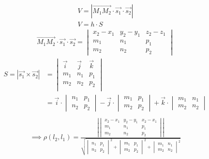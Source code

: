 \begin{gather*}
  V = |\overrightarrow{M_1M_2} \cdot \vec{s_1} \cdot \vec{s_2}| \\
  V= h \cdot S
\end{gather*}
\begin{gather*}
  \overrightarrow{M_1M_2} \cdot \vec{s_1} \cdot \vec{s_2} = 
  \begin{vmatrix}
    x_2 - x_1 & y_2 - y_1 & z_2 - z_1 \\
    m_1 & n_1 & p_1 \\
    m_2 & n_2 & p_2
  \end{vmatrix}
\end{gather*}
\begin{align*}
  S = |\vec{s_1} \times \vec{s_2}| &= 
  \begin{vmatrix}
    \vec{i} & \vec{j} & \vec{k} \\
    m_1 & n_1 & p_1 \\
    m_2 & n_2 & p_2 \\
  \end{vmatrix} \\
  &=
  \vec{i} \cdot 
  \begin{vmatrix}
    n_1 & p_1 \\
    n_2 & p_2
  \end{vmatrix} - \vec{j} \cdot 
  \begin{vmatrix}
    m_1 & p_1 \\
    m_2 & p_2
  \end{vmatrix} + \vec{k} \cdot 
  \begin{vmatrix}
    m_1 & n_1 \\
    m_2 & n_2
  \end{vmatrix} \\
\end{align*}
\begin{gather*}
  \implies \boxed{\rho(l_2, l_1) = 
  \frac{
    \left|
    \begin{vmatrix}
      x_2 - x_1 & y_2 - y_1 & x_2 - x_1 \\
      m_1 & n_1 & p_1 \\
      m_2 & n_2 & p_2
    \end{vmatrix}
    \right| 
  }{
  \sqrt{
    \begin{vmatrix}
      n_1 & p_1 \\
      n_2 & p_2
    \end{vmatrix}^2 +
    \begin{vmatrix}
      m_1 & p_1 \\
      m_2 & p_2
    \end{vmatrix}^2 +  
    \begin{vmatrix}
      m_1 & n_1 \\
      m_2 & n_2
    \end{vmatrix}^2 
  } 
  }}
\end{gather*}
  

